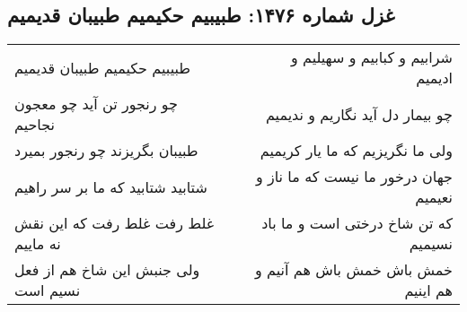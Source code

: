 \begin{center}
\section*{غزل شماره ۱۴۷۶: طبیبیم حکیمیم طبیبان قدیمیم}
\label{sec:1476}
\begin{longtable}{l p{0.5cm} r}
طبیبیم حکیمیم طبیبان قدیمیم
&&
شرابیم و کبابیم و سهیلیم و ادیمیم
\\
چو رنجور تن آید چو معجون نجاحیم
&&
چو بیمار دل آید نگاریم و ندیمیم
\\
طبیبان بگریزند چو رنجور بمیرد
&&
ولی ما نگریزیم که ما یار کریمیم
\\
شتابید شتابید که ما بر سر راهیم
&&
جهان درخور ما نیست که ما ناز و نعیمیم
\\
غلط رفت غلط رفت که این نقش نه ماییم
&&
که تن شاخ درختی است و ما باد نسیمیم
\\
ولی جنبش این شاخ هم از فعل نسیم است
&&
خمش باش خمش باش هم آنیم و هم اینیم
\\
\end{longtable}
\end{center}
